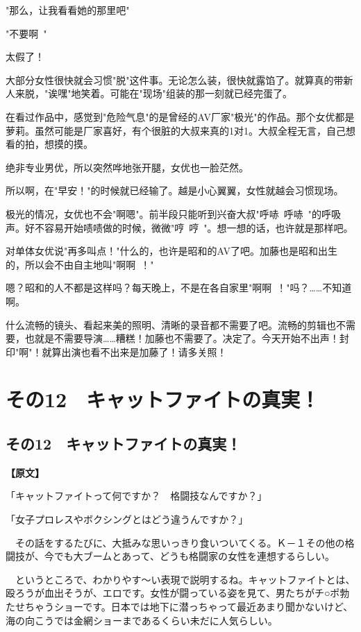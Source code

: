 \documentclass[12pt,UTF8]{ctexbook}
\begin{document}
{{"那么，让我看看她的那里吧"

"不要啊~"

太假了！

大部分女性很快就会习惯"脱"这件事。无论怎么装，很快就露馅了。就算真的带新人来脱，"诶嘿"地笑着。可能在"现场"组装的那一刻就已经完蛋了。

在看过作品中，感觉到"危险气息"的是曾经的AV厂家"极光"的作品。那个女优都是萝莉。虽然可能是厂家喜好，有个很脏的大叔来真的1对1。大叔全程无言，自己想看的拍，想摸的摸。

绝非专业男优，所以突然哗地张开腿，女优也一脸茫然。

所以啊，在"早安！"的时候就已经输了。越是小心翼翼，女性就越会习惯现场。

极光的情况，女优也不会"啊嗯"。前半段只能听到兴奋大叔"呼哧~呼哧~"的呼吸声。好不容易开始啧啧做的时候，微微"哼~哼~"。想一想的话，也许就是那样吧。

对单体女优说"再多叫点！"什么的，也许是昭和的AV了吧。加藤也是昭和出生的，所以会不由自主地叫"啊啊~！"

嗯？昭和的人不都是这样吗？每天晚上，不是在各自家里"啊啊~！"吗？……不知道啊。

什么流畅的镜头、看起来美的照明、清晰的录音都不需要了吧。流畅的剪辑也不需要，也就是不需要导演……糟糕！加藤也不需要了。决定了。今天开始不出声！封印"啊"！就算出演也看不出来是加藤了！请多关照！
}

\chapter{その12　キャットファイトの真実！}
\label{chap:12}

\section{その12　キャットファイトの真実！}

\vspace{1ex}
\parbox{0.9\linewidth}{
\textbf{【原文】}\par

「キャットファイトって何ですか？　格闘技なんですか？」

「女子プロレスやボクシングとはどう違うんですか？」

　その話をするたびに、大抵みな思いっきり食いついてくる。Ｋ－１その他の格闘技が、今でも大ブームとあって、どうも格闘家の女性を連想するらしい。

　というところで、わかりやす～い表現で説明するね。キャットファイトとは、殴ろうが血出そうが、エロです。女性が闘っている姿を見て、男たちがチ○ポ勃たせちゃうショーです。日本では地下に潜っちゃって最近あまり聞かないけど、海の向こうでは金網ショーまであるくらい未だに人気らしい。

}}
\end{document}
